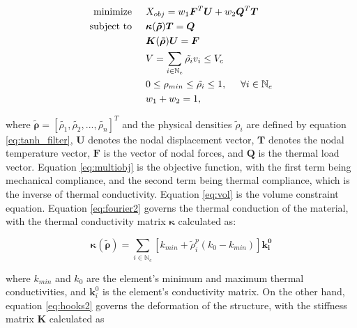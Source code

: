 \documentclass[../main.tex]{subfiles}
\begin{document}
\begin{align}
  \text{minimize}  & \hspace{0.5cm} X_{obj} = w_1 \bm{F}^T \bm{U} + w_2 \bm{Q}^T \bm{T}  \label{eq:multiobj}\\ 
  \text{subject to} & \hspace{0.5cm} \bm{\kappa}(\bm{\tilde{\rho}}) \bm{T} = \bm{Q} \label{eq:fourier2} \\
                    &  \hspace{0.5cm} \bm{K}(\bm{\tilde{\rho}}){\bm{U}} = \bm{F} \label{eq:hooks2} \\
    & \hspace{0.5cm} V = \sum _{i \in \mathbb{N}_e } \tilde{\rho_i} v_i \leq V_c \label{eq:vol} \\ 
    & \hspace{0.5cm} 0 \leq \rho_{min} \leq \tilde{\rho_i} \leq 1, \hspace{0.5cm} \forall i \in \mathbb{N}_e  \\
    & \hspace{0.5cm} w_1 + w_2 = 1,  \label{eq:multiobj_end}
 \end{align}

 where $\bm{\tilde{\rho}} = [\tilde{\rho_1}, \tilde{\rho_2}, ... , \tilde{\rho_n}]^T$ and the physical densities $\tilde{\rho}_i$ are defined by equation \ref{eq:tanh_filter}, $\bm{U}$ denotes the nodal displacement vector, $\bm{T}$ denotes the nodal temperature vector, $\bm{F}$ is the vector of nodal forces, and $\bm{Q}$ is the thermal load vector. Equation \ref{eq:multiobj} is the objective function, with the first term being mechanical compliance, and the second term being thermal compliance, which is the inverse of thermal conductivity. Equation \ref{eq:vol} is the volume constraint equation. Equation \ref{eq:fourier2} governs the thermal conduction of the material, with the thermal conductivity matrix $\bm{\kappa}$ calculated as:
  

\begin{equation}
  \bm{\kappa}(\bm{\tilde{\rho}}) = \sum_{i \in \mathbb{N}_e}[k_{min} + \tilde{\rho}_i^p(k_0 - k_{min})]\bm{k_i^0}
\label{eq:globalcond}
\end{equation}

where $k_{min}$ and $k_0$ are the element's minimum and maximum thermal conductivities, and $\bm{k}_i^0$ is the element's conductivity matrix. On the other hand, equation \ref{eq:hooks2} governs the deformation of the structure, with the stiffness matrix $\bm{K}$ calculated as
\end{document}
